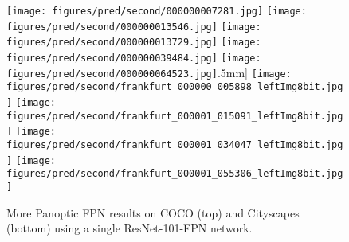 \documentclass[10pt,twocolumn,letterpaper]{article}
\begin{document}
{\begin{figure*}
\texttt{[image: figures/pred/second/000000007281.jpg]}
\texttt{[image: figures/pred/second/000000013546.jpg]}
\texttt{[image: figures/pred/second/000000013729.jpg]}
\texttt{[image: figures/pred/second/000000039484.jpg]}
\texttt{[image: figures/pred/second/000000064523.jpg]}\0.5mm]
\texttt{[image: figures/pred/second/frankfurt\_000000\_005898\_leftImg8bit.jpg]}
\texttt{[image: figures/pred/second/frankfurt\_000001\_015091\_leftImg8bit.jpg]}
\texttt{[image: figures/pred/second/frankfurt\_000001\_034047\_leftImg8bit.jpg]}
\texttt{[image: figures/pred/second/frankfurt\_000001\_055306\_leftImg8bit.jpg]}\vspace{-2mm}
\caption{More Panoptic FPN results on COCO (top) and Cityscapes (bottom) using a single ResNet-101-FPN network.}
\label{fig:results:2}\vspace{-2mm}
\end{figure*}


}
\end{document}
